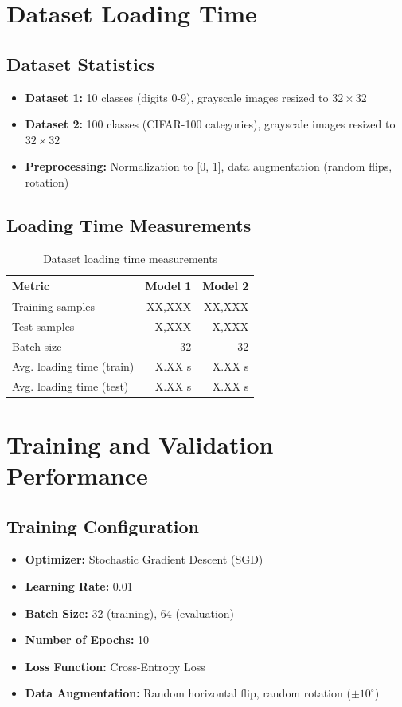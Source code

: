 \documentclass[11pt,a4paper]{article}
\begin{document}
\section{Dataset Loading Time}

\subsection{Dataset Statistics}
\begin{itemize}
    \item \textbf{Dataset 1:} 10 classes (digits 0-9), grayscale images resized to $32 \times 32$
    \item \textbf{Dataset 2:} 100 classes (CIFAR-100 categories), grayscale images resized to $32 \times 32$
    \item \textbf{Preprocessing:} Normalization to [0, 1], data augmentation (random flips, rotation)
\end{itemize}

\subsection{Loading Time Measurements}
\begin{table}[H]
\centering
\begin{tabular}{lrr}
\toprule
\textbf{Metric} & \textbf{Model 1} & \textbf{Model 2} \\
\midrule
Training samples & XX,XXX & XX,XXX \\
Test samples & X,XXX & X,XXX \\
Batch size & 32 & 32 \\
Avg. loading time (train) & X.XX s & X.XX s \\
Avg. loading time (test) & X.XX s & X.XX s \\
\bottomrule
\end{tabular}
\caption{Dataset loading time measurements}
\end{table}

\section{Training and Validation Performance}

\subsection{Training Configuration}
\begin{itemize}
    \item \textbf{Optimizer:} Stochastic Gradient Descent (SGD)
    \item \textbf{Learning Rate:} 0.01
    \item \textbf{Batch Size:} 32 (training), 64 (evaluation)
    \item \textbf{Number of Epochs:} 10
    \item \textbf{Loss Function:} Cross-Entropy Loss
    \item \textbf{Data Augmentation:} Random horizontal flip, random rotation ($\pm 10^\circ$)
\end{itemize}
\end{document}
